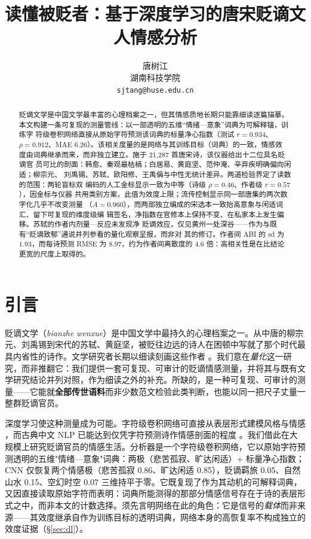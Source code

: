 \documentclass[11pt]{article}
\title{读懂被贬者：基于深度学习的唐宋贬谪文人情感分析}
\author{唐树江\\
湖南科技学院\\
\texttt{sjtang@huse.edu.cn}}
\date{}
\begin{document}
\maketitle

\begin{abstract}
贬谪文学是中国文学最丰富的心理档案之一，但其情感质地长期只能靠细读逐篇描摹。
本文构建一条可复现的测量管线：以一部透明的五维“情绪—意象”词典为可解释锚，训练字
符级卷积网络直接从原始字符预测该词典的标量净心指数（测试 $r{=}0.934$、
$\rho{=}0.912$、MAE $6.26$）。该相关度量的是网络与其训练目标（词典）的一致，情感效
度由词典继承而来，而非独立建立。施于 21{,}287 首唐宋诗，该仪器给出十二位具名贬谪官
员可比的剖面：韩愈、秦观最枯槁；白居易、黄庭坚、范仲淹、辛弃疾明确偏向闲适；柳宗元、
刘禹锡、苏轼、欧阳修、王禹偁与中性无统计差异。两道检验界定了读数的范围：两轮盲标双
编码的人工金标显示一致为中等（诗级 $\rho{=}0.46$、作者级 $r{=}0.57$），因金标与仪器
共用类别方案，此值为效度上限；流传控制显示同一部唐集的两次数字化几乎不改变测量
（$A{=}0.960$），而两部独立编成的宋选本一致抬高意象与闲适词汇、留下可复现的维度级编
辑签名，净指数在官修本上保持不变、在私家本上发生偏移。苏轼的作者内剂量—反应未发现净
贬谪效应，仅见黄州一处深谷——作为与既有“贬谪致郁”通说并列参看的量化观察呈报，而非对
其的修订。作者间 ABI 的 sd 为 $1.93$，而每诗预测 RMSE 为 $8.97$，约为作者间离散度的
$4.6$ 倍：高相关性是在比结论更宽的尺度上取得的。
\end{abstract}

\section{引言}
\label{sec:intro}
贬谪文学（\emph{bianzhe wenxue}）是中国文学中最持久的心理档案之一。从中唐的柳宗元、刘禹锡到宋代的苏轼、黄庭坚，被贬往边远的诗人在困顿中写就了那个时代最具内省性的诗作。文学研究者长期以细读刻画这些作者 \citep{shang2007exiled,xing2024liusu}。我们意在\emph{量化}这一研究，而非推翻它：我们提供一套可复现、可审计的贬谪情感测量，并将其与既有文学研究结论并列对照，作为细读之外的补充。所缺的，是一种可复现、可审计的测量——它能就\textbf{全部传世语料}而非少数范文检验此类判断，也能以同一把尺子丈量一整群贬谪官员。

深度学习使这种测量成为可能。字符级卷积网络可直接从表层形式建模风格与情感 \citep{kim2014convolutional}，而古典中文 NLP 已能达到仅凭字符预测诗作情感剖面的程度 \citep{hou2015sentiment,du2025multimodal}。我们借此在大规模上研究贬谪官员的情感生活。分析器是一个字符级卷积网络，它以原始字符预测透明的五维"情绪—意象"词典：两极（悲苦孤寂、旷达闲适）+ 标量净心指数；CNN 仅恢复两个情感极（悲苦孤寂 0.86、旷达闲适 0.85），贬谪羁旅 0.05、自然山水 0.15、空幻时空 0.07 三维持平于零。它既复现了作为其动机的可解释词典，又因直接读取原始字符而表明：词典所能测得的那部分情感信号存在于诗的表层形式之中，而非本文的计数选择。须先言明网络在此的角色：它是信号的\emph{载体}而非来源——其效度继承自作为训练目标的透明词典，网络本身的高恢复率不构成独立的效度证据（\S\ref{sec:dl}）。
\end{document}
